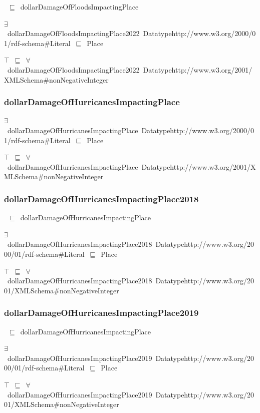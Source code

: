 \documentclass{article}
\begin{document}
~\ensuremath{\sqsubseteq}~dollarDamageOfFloodsImpactingPlace

\ensuremath{\exists}~dollarDamageOfFloodsImpactingPlace2022~Datatypehttp://www.w3.org/2000/01/rdf-schema#Literal~\ensuremath{\sqsubseteq}~Place

\ensuremath{\top}~\ensuremath{\sqsubseteq}~\ensuremath{\forall}~dollarDamageOfFloodsImpactingPlace2022~Datatypehttp://www.w3.org/2001/XMLSchema#nonNegativeInteger

\subsubsection*{dollarDamageOfHurricanesImpactingPlace}

\ensuremath{\exists}~dollarDamageOfHurricanesImpactingPlace~Datatypehttp://www.w3.org/2000/01/rdf-schema#Literal~\ensuremath{\sqsubseteq}~Place

\ensuremath{\top}~\ensuremath{\sqsubseteq}~\ensuremath{\forall}~dollarDamageOfHurricanesImpactingPlace~Datatypehttp://www.w3.org/2001/XMLSchema#nonNegativeInteger

\subsubsection*{dollarDamageOfHurricanesImpactingPlace2018}

~\ensuremath{\sqsubseteq}~dollarDamageOfHurricanesImpactingPlace

\ensuremath{\exists}~dollarDamageOfHurricanesImpactingPlace2018~Datatypehttp://www.w3.org/2000/01/rdf-schema#Literal~\ensuremath{\sqsubseteq}~Place

\ensuremath{\top}~\ensuremath{\sqsubseteq}~\ensuremath{\forall}~dollarDamageOfHurricanesImpactingPlace2018~Datatypehttp://www.w3.org/2001/XMLSchema#nonNegativeInteger

\subsubsection*{dollarDamageOfHurricanesImpactingPlace2019}

~\ensuremath{\sqsubseteq}~dollarDamageOfHurricanesImpactingPlace

\ensuremath{\exists}~dollarDamageOfHurricanesImpactingPlace2019~Datatypehttp://www.w3.org/2000/01/rdf-schema#Literal~\ensuremath{\sqsubseteq}~Place

\ensuremath{\top}~\ensuremath{\sqsubseteq}~\ensuremath{\forall}~dollarDamageOfHurricanesImpactingPlace2019~Datatypehttp://www.w3.org/2001/XMLSchema#nonNegativeInteger
\end{document}

